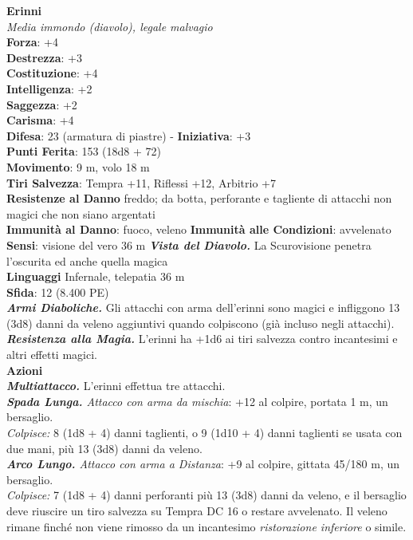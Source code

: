 \begin{multicols}{2}
\medskip\textbf{Erinni}\\
\emph{Media immondo (diavolo), legale malvagio}\\
\textbf{Forza}: +4\\
\textbf{Destrezza}: +3\\
\textbf{Costituzione}: +4\\
\textbf{Intelligenza}: +2\\
\textbf{Saggezza}: +2\\
\textbf{Carisma}: +4\\
\textbf{Difesa}: 23 (armatura di piastre) - \textbf{Iniziativa}: +3\\
\textbf{Punti Ferita}: 153 (18d8 + 72)\\
\textbf{Movimento}: 9 m, volo 18 m\\
\textbf{Tiri Salvezza}: Tempra +11, Riflessi +12, Arbitrio +7\\
\textbf{Resistenze al Danno} freddo; da botta, perforante e tagliente di attacchi non magici che non siano argentati\\
\textbf{Immunità al Danno}: fuoco, veleno
\textbf{Immunità alle Condizioni}: avvelenato\\
\textbf{Sensi}: visione del vero 36 m
\emph{\textbf{Vista del Diavolo.}} La Scurovisione penetra l'oscurita ed anche quella magica\\
\textbf{Linguaggi} Infernale, telepatia 36 m \\
\textbf{Sfida}: 12 (8.400 PE)\smallskip\\
\emph{\textbf{Armi Diaboliche.}} Gli attacchi con arma dell'erinni sono magici e infliggono 13 (3d8) danni da veleno aggiuntivi quando colpiscono (già incluso negli attacchi).\\
\emph{\textbf{Resistenza alla Magia.}} L'erinni ha +1d6 ai tiri salvezza contro incantesimi e altri effetti magici.\\
\smallskip\textbf{Azioni}\\
\emph{\textbf{Multiattacco.}} L'erinni effettua tre attacchi.\\
\emph{\textbf{Spada Lunga.} Attacco con arma da mischia}: +12 al colpire, portata 1 m, un bersaglio.\\
\emph{Colpisce:} 8 (1d8 + 4) danni taglienti, o 9 (1d10 + 4) danni taglienti se usata con due mani, più 13 (3d8) danni da veleno. \\
\emph{\textbf{Arco Lungo.} Attacco con arma a Distanza}: +9 al colpire, gittata 45/180 m, un bersaglio. \\
\emph{Colpisce:} 7 (1d8 + 4) danni perforanti più 13 (3d8) danni da veleno, e il bersaglio deve riuscire un tiro salvezza su Tempra DC  16 o restare avvelenato. Il veleno rimane finché non viene rimosso da un incantesimo \emph{ristorazione inferiore} o simile.\\

\end{multicols}
